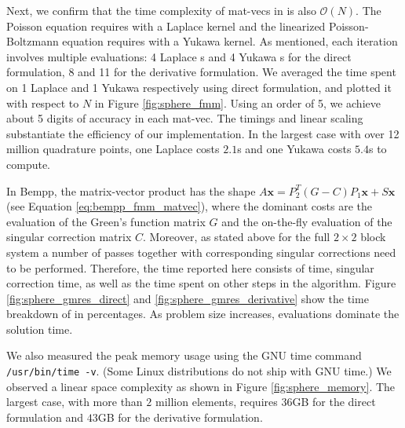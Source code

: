Next, we confirm that the time complexity of mat-vecs in \gmres is also $\mathcal{O}(N)$.
The Poisson equation requires \fmm with a Laplace kernel and the linearized Poisson-Boltzmann equation requires \fmm with a Yukawa kernel.
As mentioned, each iteration involves multiple \fmm evaluations: 4 Laplace {\fmm}s and 4 Yukawa {\fmm}s for the direct formulation, 8 and 11 for the derivative formulation.
We averaged the time spent on 1 Laplace \fmm and 1 Yukawa \fmm respectively using direct formulation, and plotted it with respect to $N$ in Figure \ref{fig:sphere_fmm}.
Using an \fmm order of 5, we achieve about 5 digits of accuracy in each mat-vec.
The timings and linear scaling substantiate the efficiency of our \fmm implementation.
In the largest case with over 12 million quadrature points, one Laplace \fmm costs $2.1$s and one Yukawa \fmm costs $5.4$s to compute.

In Bempp, the matrix-vector product has the shape $A\mathbf{x} = P_2^T (G - C)P_1 \mathbf{x} + S \mathbf{x}$ (see Equation \ref{eq:bempp_fmm_matvec}), where the dominant costs are the \fmm evaluation of the Green's function matrix $G$ and the on-the-fly evaluation of the singular correction matrix $C$. Moreover, as stated above for the full $2\times 2$ block system a number of \fmm passes together with corresponding singular corrections need to be performed.
Therefore, the \gmres time reported here consists of \fmm time, singular correction time, as well as the time spent on other steps in the \gmres algorithm.
Figure \ref{fig:sphere_gmres_direct} and \ref{fig:sphere_gmres_derivative} show the time breakdown of \gmres in percentages.
As problem size increases, \fmm evaluations dominate the solution time.

We also measured the peak memory usage using the GNU time command \texttt{/usr/bin/time -v}. (Some Linux distributions do not ship with GNU time.)
We observed a linear space complexity as shown in Figure \ref{fig:sphere_memory}.
The largest case, with more than $2$ million elements, requires $36$GB for the direct formulation and $43$GB for the derivative formulation.

